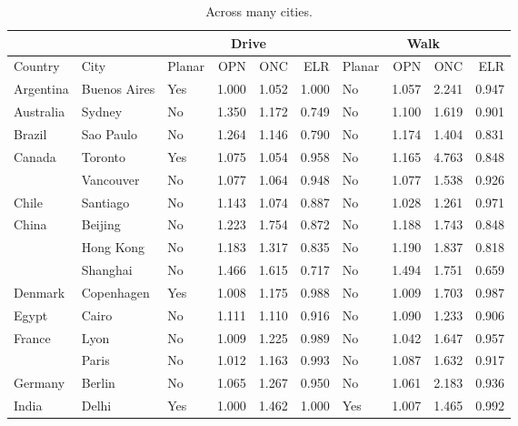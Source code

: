 \documentclass[Afour,sageh,times]{sagej}
\begin{document}
\begin{table}[htbp]
\centering
\caption{Across many cities.}
\label{tab:cities}
\begin{tabular}{ l l l r r r l r r r }
\toprule
             &               & \multicolumn{4}{|c|}{Drive}         & \multicolumn{4}{c}{Walk}            \\
\midrule
Country      & City          &  Planar  &  OPN   &  ONC   &  ELR   &  Planar  &  OPN   &  ONC   &  ELR   \\
\midrule
Argentina    & Buenos Aires  &      Yes &  1.000 &  1.052 &  1.000 &       No &  1.057 &  2.241 &  0.947 \\
Australia    & Sydney        &       No &  1.350 &  1.172 &  0.749 &       No &  1.100 &  1.619 &  0.901 \\
Brazil       & Sao Paulo     &       No &  1.264 &  1.146 &  0.790 &       No &  1.174 &  1.404 &  0.831 \\
Canada       & Toronto       &      Yes &  1.075 &  1.054 &  0.958 &       No &  1.165 &  4.763 &  0.848 \\
             & Vancouver     &       No &  1.077 &  1.064 &  0.948 &       No &  1.077 &  1.538 &  0.926 \\
Chile        & Santiago      &       No &  1.143 &  1.074 &  0.887 &       No &  1.028 &  1.261 &  0.971 \\
China        & Beijing       &       No &  1.223 &  1.754 &  0.872 &       No &  1.188 &  1.743 &  0.848 \\
             & Hong Kong     &       No &  1.183 &  1.317 &  0.835 &       No &  1.190 &  1.837 &  0.818 \\
             & Shanghai      &       No &  1.466 &  1.615 &  0.717 &       No &  1.494 &  1.751 &  0.659 \\
Denmark      & Copenhagen    &      Yes &  1.008 &  1.175 &  0.988 &       No &  1.009 &  1.703 &  0.987 \\
Egypt        & Cairo         &       No &  1.111 &  1.110 &  0.916 &       No &  1.090 &  1.233 &  0.906 \\
France       & Lyon          &       No &  1.009 &  1.225 &  0.989 &       No &  1.042 &  1.647 &  0.957 \\
             & Paris         &       No &  1.012 &  1.163 &  0.993 &       No &  1.087 &  1.632 &  0.917 \\
Germany      & Berlin        &       No &  1.065 &  1.267 &  0.950 &       No &  1.061 &  2.183 &  0.936 \\
India        & Delhi         &      Yes &  1.000 &  1.462 &  1.000 &      Yes &  1.007 &  1.465 &  0.992 \\

\end{tabular}
\end{table}
\end{document}
